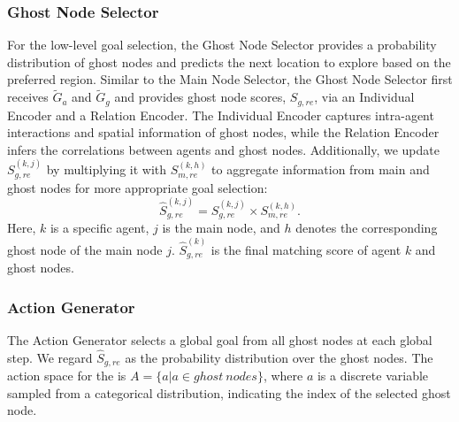 \subsubsection{Ghost Node Selector}
For the low-level goal selection, the Ghost Node Selector provides a probability distribution of ghost nodes and predicts the next location to explore based on the preferred region. Similar to the Main Node Selector, the Ghost Node Selector first receives $\tilde{G}_{a}$ and $\tilde{G}_{g}$ and provides ghost node scores, $S_{g, re}$, via an Individual Encoder and a Relation Encoder. The Individual Encoder captures intra-agent interactions and spatial information of ghost nodes, while the Relation Encoder infers the correlations between agents and ghost nodes. Additionally, we update $S_{g, re}^{(k,j)}$ by multiplying it with $S_{m, re}^{(k,h)}$ to aggregate information from main and ghost nodes for more appropriate goal selection:
\begin{equation}
    \hat{S}_{g, re}^{(k,j)} =  S_{g, re}^{(k,j)} \times S_{m, re}^{(k,h)}.
\label{eq:multiply}
\end{equation}
Here, $k$ is a specific agent, $j$ is the main node, and $h$ denotes the corresponding ghost node of the main node $j$. $\hat{S}_{g, re}^{(k)}$ is the final matching score of agent $k$ and ghost nodes.


\subsubsection{Action Generator}
The Action Generator selects a global goal from all ghost nodes at each global step. We regard $\hat{S}_{g, re}$ as the probability distribution over the ghost nodes. The action space for the {\planner} is $A=\{a|a\in ghost\ nodes\}$, where $a$ is a discrete variable sampled from a categorical distribution, indicating the index of the selected ghost node.







